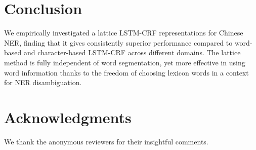\documentclass[11pt,a4paper]{article}
\begin{document}
\begin{CJK*}{UTF8}{gbsn}
\section{Conclusion}
We empirically investigated a lattice LSTM-CRF representations for Chinese NER, finding that it gives consistently superior performance compared to word-based and character-based LSTM-CRF across different domains. The lattice method is fully independent of word segmentation, yet more effective in using word information thanks to the freedom of choosing lexicon words in a context for NER disambiguation.



\section*{Acknowledgments}
We thank the anonymous reviewers for their insightful comments.





\end{CJK*}
\end{document}
